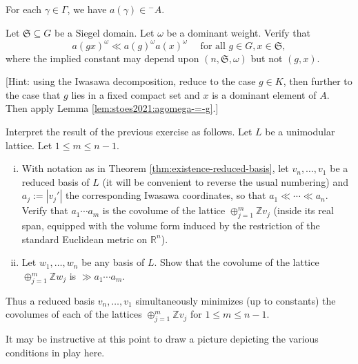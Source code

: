 \documentclass[reqno]{amsart} 
\begin{document}
\begin{corollary}
  For each $\gamma \in \Gamma$, we have $a(\gamma ) \in {}^- A$.
\end{corollary}


\begin{exercise}
  Let $\mathfrak{S} \subseteq G$ be a Siegel domain.  Let $\omega$ be a dominant weight.  Verify that
  \begin{equation*}
    a(g x)^{\omega} \ll a(g)^{\omega} a(x)^{\omega} \quad \text{ for all } g \in G, x \in \mathfrak{S},
  \end{equation*}
  where the implied constant may depend upon $(n,\mathfrak{S},\omega)$ but not $(g,x)$.

  [Hint: using the Iwasawa decomposition, reduce to the case $g \in K$, then further to the case that $g$ lies in a fixed compact set and $x$ is a dominant element of $A$.  Then apply Lemma \ref{lem:stoes2021:agomega-=-g}.]
\end{exercise}
\begin{exercise}
  Interpret the result of the previous exercise as follows.  Let $L$ be a unimodular lattice.  Let $1 \leq m \leq n-1$.
  \begin{enumerate}
    [(i)]
  \item With notation as in Theorem \ref{thm:existence-reduced-basis}, let $v_n,\dotsc,v_1$ be a reduced basis of $L$ (it will be convenient to reverse the usual numbering) and $a_j := |v_j'|$ the corresponding Iwasawa coordinates, so that $a_1 \ll \dotsb \ll a_n$.  Verify that $a_1 \dotsb a_m$ is the covolume of the lattice $\oplus_{j=1}^m \mathbb{Z} v_j$ (inside its real span, equipped with the volume form induced by the restriction of the standard Euclidean metric on $\mathbb{R}^n$).
  \item Let $w_1,\dotsc,w_n$ be any basis of $L$.  Show that the covolume of the lattice $\oplus_{j=1}^m \mathbb{Z} w_j$ is $\gg a_1 \dotsb a_m$.
  \end{enumerate}
  Thus a reduced basis $v_n,\dotsc,v_1$ simultaneously minimizes (up to constants) the covolumes of each of the lattices $\oplus_{j=1}^m \mathbb{Z} v_j$ for $1 \leq m \leq n-1$.
\end{exercise}



It may be instructive at this point to draw a picture depicting the various conditions in play here.
\end{document}
